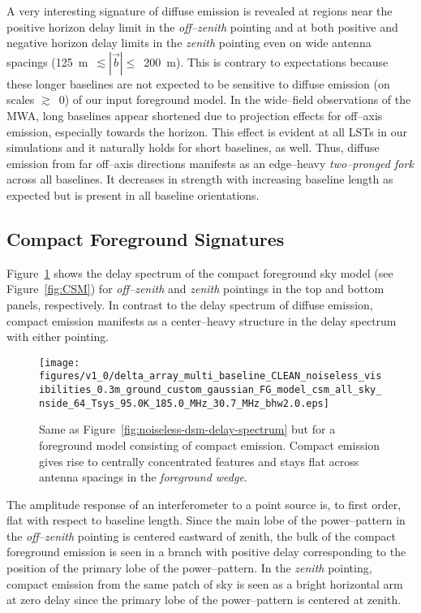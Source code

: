 \documentclass[preprint2,iop,numberedappendix]{emulateapj}
\begin{document}
A very interesting signature of diffuse emission is revealed at regions near the positive horizon delay limit in the {\it off--zenith} pointing and at both positive and negative horizon delay limits in the {\it zenith} pointing even on wide antenna spacings (125~m~$\lesssim |\vec{b}|\le$~200~m). This is contrary to expectations because these longer baselines are not expected to be sensitive to diffuse emission (on scales $\gtrsim$~0) of our input foreground model. In the wide--field observations of the MWA, long baselines appear shortened due to projection effects for off--axis emission, especially towards the horizon.  This effect is evident at all LSTs in our simulations and it naturally holds for short baselines, as well. Thus, diffuse emission from far off--axis directions manifests as an edge--heavy {\it two--pronged fork} across all baselines. It decreases in strength with increasing baseline length as expected but is present in all baseline orientations.   %

\subsection{Compact Foreground Signatures}\label{sec:compact}

Figure~\ref{fig:noiseless-csm-delay-spectrum} shows the delay spectrum of the compact foreground sky model (see Figure~\ref{fig:CSM}) for {\it off--zenith} and {\it zenith} pointings in the top and bottom panels, respectively. In contrast to the delay spectrum of diffuse emission, compact emission manifests as a center--heavy structure in the delay spectrum with either pointing. 

\begin{figure}[htb]
\centering
\texttt{[image: figures/v1\_0/delta\_array\_multi\_baseline\_CLEAN\_noiseless\_visibilities\_0.3m\_ground\_custom\_gaussian\_FG\_model\_csm\_all\_sky\_nside\_64\_Tsys\_95.0K\_185.0\_MHz\_30.7\_MHz\_bhw2.0.eps]}
\caption{Same as Figure~\ref{fig:noiseless-dsm-delay-spectrum} but for a foreground model consisting of compact emission. Compact emission gives rise to centrally concentrated features and stays flat across antenna spacings in the {\it foreground wedge}.\label{fig:noiseless-csm-delay-spectrum}}
\end{figure}

The amplitude response of an interferometer to a point source is, to first order, flat with respect to baseline length. Since the main lobe of the power--pattern in the {\it off--zenith} pointing is centered eastward of zenith, the bulk of the compact foreground emission is seen in a branch with positive delay corresponding to the position of the primary lobe of the power--pattern. In the {\it zenith} pointing, compact emission from the same patch of sky is seen as a bright horizontal arm at zero delay  since the primary lobe of the power--pattern is centered at zenith. 
\end{document}

